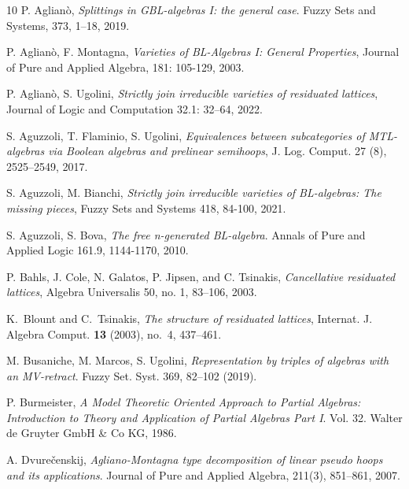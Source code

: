 \documentclass{amsart}
\theoremstyle{definition}
\numberwithin{equation}{section}
\begin{document}
\begin{thebibliography}{10}
P. Aglian\`o, {\em Splittings in GBL-algebras I: the general case}. Fuzzy Sets and Systems, 373, 1--18, 2019.

P. Aglian\`o, F. Montagna, \emph{Varieties of BL-Algebras I: General Properties}, Journal of Pure and Applied Algebra, 181: 105-129, 2003.

P. Aglian\`o,  S. Ugolini, {\em Strictly join irreducible varieties of residuated lattices}, Journal of Logic and Computation 32.1: 32--64, 2022. 

  S. Aguzzoli, T. Flaminio, S. Ugolini, {\em Equivalences between subcategories of MTL-algebras via Boolean algebras and prelinear semihoops},
J. Log. Comput. 27 (8), 2525--2549, 2017.

S. Aguzzoli, M. Bianchi, {\em Strictly join irreducible varieties of BL-algebras: The missing pieces}, Fuzzy Sets and Systems 418, 84-100, 2021.

S. Aguzzoli, S. Bova, {\em The free n-generated BL-algebra}. Annals of Pure and Applied Logic 161.9, 1144-1170, 2010.


P. Bahls, J. Cole, N. Galatos, P. Jipsen, and C. Tsinakis, {\em Cancellative residuated lattices}, Algebra Universalis 50, no. 1, 83--106, 2003.

K.~Blount and C.~Tsinakis, \emph{The structure of residuated lattices},
  Internat. J. Algebra Comput. \textbf{13} (2003), no.~4, 437--461.
  
M. Busaniche, M. Marcos, S. Ugolini, {\em Representation by triples of algebras with an MV-retract}. Fuzzy Set. Syst. 369, 82--102 (2019).
  
  
P. Burmeister, {\em A Model Theoretic Oriented Approach to Partial Algebras: Introduction to Theory and Application of Partial Algebras Part I}. Vol. 32. Walter de Gruyter GmbH \& Co KG, 1986.

A. Dvure\v censkij,  {\em Agliano-Montagna type decomposition of linear pseudo hoops and its applications}. Journal of Pure and Applied Algebra, 211(3), 851--861, 2007.


\end{thebibliography}
\end{document}
